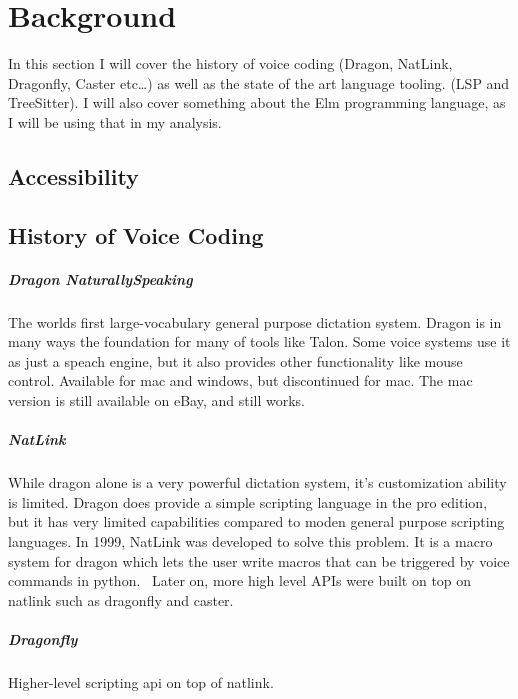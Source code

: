 \documentclass[../thesis.tex]{subfiles}
\begin{document}
\chapter{Background}\label{background}
In this section I will cover the history of voice coding (Dragon, NatLink, Dragonfly, Caster etc\ldots)
as well as the state of the art language tooling. (LSP and TreeSitter).
I will also cover something about the Elm programming language, as I will be using that in my analysis.

\section{Accessibility}%
\label{sec:accessibility}

\section{History of Voice Coding}

\paragraph{Dragon NaturallySpeaking}
The worlds first large-vocabulary general purpose dictation system.
Dragon is in many ways the foundation for many of tools like Talon.
Some voice systems use it as just a speach engine, but it also provides other functionality like mouse control.
Available for mac and windows, but discontinued for mac.%
The mac version is still available on eBay, and still works. %

\paragraph{NatLink}
While dragon alone is a very powerful dictation system, it's customization ability is limited.
Dragon does provide a simple scripting language in the pro edition, but it has very limited capabilities compared to
moden general purpose scripting languages.
In 1999, NatLink was developed to solve this problem. It is a macro system for dragon which lets the user write macros that can be triggered by voice commands
in python.~\parencite{gould2001implementation}
Later on, more high level APIs were built on top on natlink such as dragonfly and caster. %

\paragraph{Dragonfly}
Higher-level scripting api on top of natlink.
\end{document}
